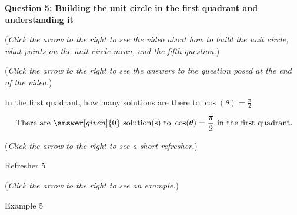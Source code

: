 \documentclass{ximera}
\begin{document}
\textbf{Question 5: Building the unit circle in the first quadrant and understanding it}
\begin{question}
\begin{flushright}
{\color{blue}(\emph{Click the arrow to the right to see
the video about how to build the unit circle, what points
on the unit circle mean, and the fifth question.})}
\end{flushright}
\begin{center}
\begin{expandable}
{\color{blue}(\emph{Click the arrow to the right to see the answers 
to the question posed at the end of the video.})}
\begin{expandable}
In the first quadrant, how many solutions are there to $\cos(\theta) = \frac{\pi}{2}$
\begin{prompt}
\[
\text{ There are }\answer[given]{0}\text{ solution(s)
to }\cos(\theta)=\frac{\pi}{2}\text{ in the first quadrant.}
\]
\end{prompt}
\begin{flushright}
{\color{blue}(\emph{Click the arrow to the right to see a short refresher.})}
\end{flushright}
\begin{expandable}
Refresher 5
\end{expandable}
\begin{flushright}
{\color{blue}(\emph{Click the arrow to the right to see an example.})}
\end{flushright}
\begin{expandable}
Example 5
\end{expandable}
\end{expandable}
\end{expandable}
\end{center}
\end{question}
\end{document}
